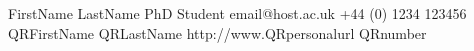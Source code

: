 \documentclass{ecr_card}
\begin{document}
\vcardfront
	{FirstName}
	{LastName}
	{PhD Student}
	{email@host.ac.uk}
	{+44 (0) 1234 123456}
	{QRFirstName}
	{QRLastName}
	{http://www.QRpersonalurl}
	{QRnumber}
\vcardback{}
\end{document}
